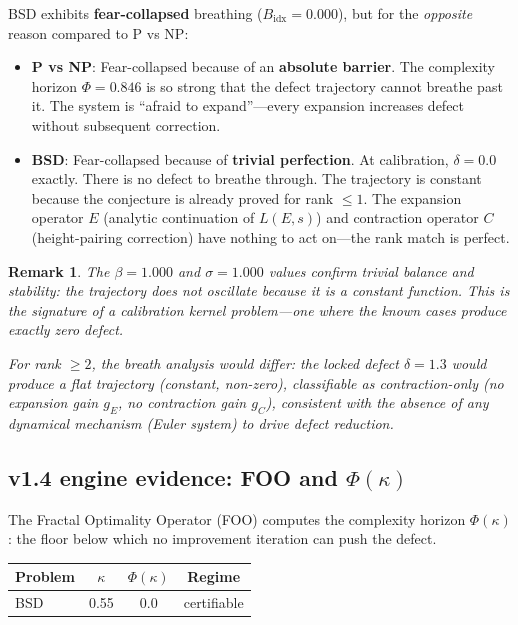 \documentclass[11pt]{article}
\newtheorem{remark}[theorem]{Remark}
\begin{document}
\noindent
BSD exhibits \textbf{fear-collapsed} breathing ($B_{\mathrm{idx}} = 0.000$),
but for the \emph{opposite} reason compared to P vs NP:

\begin{itemize}
  \item \textbf{P vs NP}: Fear-collapsed because of an \textbf{absolute
    barrier}.  The complexity horizon $\Phi = 0.846$ is so strong that the
    defect trajectory cannot breathe past it.  The system is ``afraid to
    expand''---every expansion increases defect without subsequent correction.

  \item \textbf{BSD}: Fear-collapsed because of \textbf{trivial perfection}.
    At calibration, $\delta = 0.0$ exactly.  There is no defect to breathe
    through.  The trajectory is constant because the conjecture is already
    proved for rank $\leq 1$.  The expansion operator $E$ (analytic
    continuation of $L(E,s)$) and contraction operator $C$ (height-pairing
    correction) have nothing to act on---the rank match is perfect.
\end{itemize}

\begin{remark}
The $\beta = 1.000$ and $\sigma = 1.000$ values confirm trivial balance and
stability: the trajectory does not oscillate because it is a constant
function.  This is the signature of a calibration kernel problem---one where
the known cases produce exactly zero defect.

For rank $\geq 2$, the breath analysis would differ: the locked defect
$\delta = 1.3$ would produce a flat trajectory (constant, non-zero),
classifiable as \emph{contraction-only} (no expansion gain $g_E$, no
contraction gain $g_C$), consistent with the absence of any dynamical
mechanism (Euler system) to drive defect reduction.
\end{remark}

\subsection{v1.4 engine evidence: FOO and $\Phi(\kappa)$}
\label{sec:foo-bsd}

The Fractal Optimality Operator (FOO) computes the complexity horizon
$\Phi(\kappa)$: the floor below which no improvement iteration can push the
defect.

\begin{center}
\begin{tabular}{lccc}
\hline
\textbf{Problem} & $\kappa$ & $\Phi(\kappa)$ & \textbf{Regime} \\
\hline
BSD & 0.55 & 0.0 & certifiable \\
\hline
\end{tabular}
\end{center}
\end{document}
